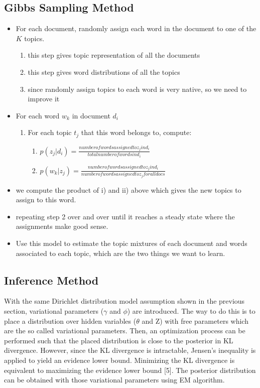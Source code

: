 \documentclass{article} %
\begin{document}
\subsection{Gibbs Sampling Method}
\begin{itemize}
\item For each document, randomly assign each word in the document to one of the $K$ topics.
\begin{enumerate}
\item this step gives topic representation of all the documents
\item this step gives word distributions of all the topics
\item since randomly assign topics to each word is very native, so we need to improve it
\end{enumerate}
\item For each word $w_k$ in document $d_i$
\begin{enumerate}
\item For each topic $t_j$ that this word belongs to, compute:
\begin{enumerate}
\item $p(z_j | d_i)  = \frac{number of words assigned to z_j in d_i}{total number of words in d_i}$
\item $p( w_k |  z_j) = \frac{number of words assigned to z_j in d_i}{number of words assigned to z_j for all docs}$
\end{enumerate}
\end{enumerate}
\item we compute the product of i) and ii) above which gives the new topics to assign to this word.
\item repeating step 2 over and over until it reaches a steady state where the assignments make good sense.
\item Use this model to estimate the topic mixtures of each document and words associated to each topic, which are the two things we want to learn.
\end{itemize}



\subsection{Inference Method}
With the same Dirichlet distribution model assumption shown in the previous section, variational parameters ($\gamma$ and $\phi$) are introduced. The way to do this is to place a distribution over hidden variables ($\theta$ and Z) with free parameters which are the so called variational parameters. Then, an optimization process can be performed such that the placed distribution is close to the posterior in KL divergence. However, since the KL divergence is intractable, Jensen's inequality is applied to yield an evidence lower bound. Minimizing the KL divergence is equivalent to maximizing the evidence lower bound [5]. The posterior distribution can be obtained with those variational parameters using EM algorithm.
\end{document}
